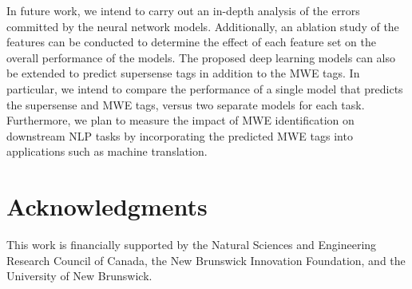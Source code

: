 \documentclass[11pt,a4paper]{article}
\begin{document}
In future work, we intend to carry out an in-depth analysis of the errors committed by the neural network models. 
Additionally, an ablation study of the features can be conducted to determine the effect of each feature set on the overall performance of the models. 
The proposed deep learning models can also be extended to predict supersense tags in addition to the MWE tags. 
In particular, we intend to compare the performance of a single model that predicts
the supersense and MWE tags, versus two separate models for each
task. Furthermore, we plan to measure the impact of MWE identification
on downstream NLP tasks by incorporating the predicted MWE tags into
applications such as machine translation.


\section*{Acknowledgments}

This work is financially supported by the Natural Sciences and Engineering Research Council of Canada, the New Brunswick Innovation Foundation, and the University of New Brunswick.





\end{document}
